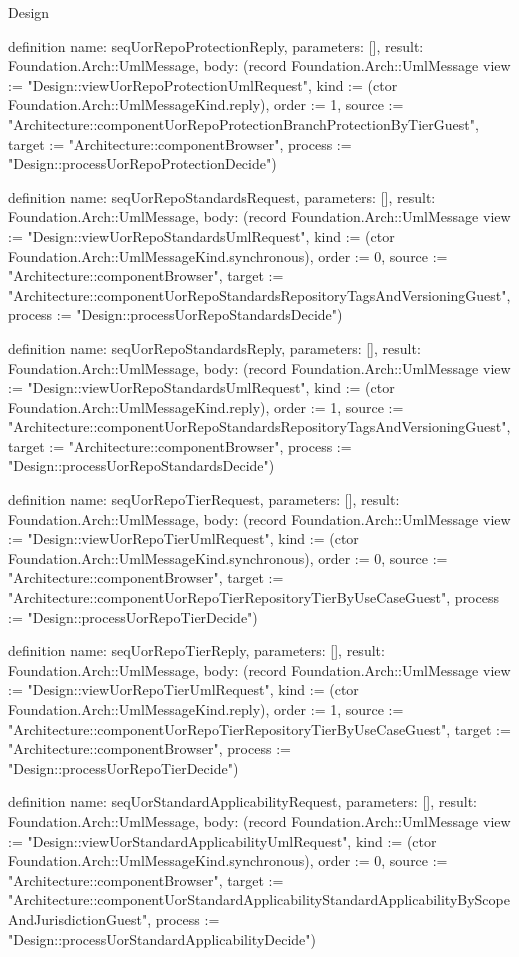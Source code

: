 \begin{lexlean}{Design}
\begin{semanticmodule}
definition{
  name: seqUorRepoProtectionReply,
  parameters: [],
  result: Foundation.Arch::UmlMessage,
  body: (record Foundation.Arch::UmlMessage {view := "Design::viewUorRepoProtectionUmlRequest", kind := (ctor Foundation.Arch::UmlMessageKind.reply), order := 1, source := "Architecture::componentUorRepoProtectionBranchProtectionByTierGuest", target := "Architecture::componentBrowser", process := "Design::processUorRepoProtectionDecide"})
}

definition{
  name: seqUorRepoStandardsRequest,
  parameters: [],
  result: Foundation.Arch::UmlMessage,
  body: (record Foundation.Arch::UmlMessage {view := "Design::viewUorRepoStandardsUmlRequest", kind := (ctor Foundation.Arch::UmlMessageKind.synchronous), order := 0, source := "Architecture::componentBrowser", target := "Architecture::componentUorRepoStandardsRepositoryTagsAndVersioningGuest", process := "Design::processUorRepoStandardsDecide"})
}

definition{
  name: seqUorRepoStandardsReply,
  parameters: [],
  result: Foundation.Arch::UmlMessage,
  body: (record Foundation.Arch::UmlMessage {view := "Design::viewUorRepoStandardsUmlRequest", kind := (ctor Foundation.Arch::UmlMessageKind.reply), order := 1, source := "Architecture::componentUorRepoStandardsRepositoryTagsAndVersioningGuest", target := "Architecture::componentBrowser", process := "Design::processUorRepoStandardsDecide"})
}

definition{
  name: seqUorRepoTierRequest,
  parameters: [],
  result: Foundation.Arch::UmlMessage,
  body: (record Foundation.Arch::UmlMessage {view := "Design::viewUorRepoTierUmlRequest", kind := (ctor Foundation.Arch::UmlMessageKind.synchronous), order := 0, source := "Architecture::componentBrowser", target := "Architecture::componentUorRepoTierRepositoryTierByUseCaseGuest", process := "Design::processUorRepoTierDecide"})
}

definition{
  name: seqUorRepoTierReply,
  parameters: [],
  result: Foundation.Arch::UmlMessage,
  body: (record Foundation.Arch::UmlMessage {view := "Design::viewUorRepoTierUmlRequest", kind := (ctor Foundation.Arch::UmlMessageKind.reply), order := 1, source := "Architecture::componentUorRepoTierRepositoryTierByUseCaseGuest", target := "Architecture::componentBrowser", process := "Design::processUorRepoTierDecide"})
}

definition{
  name: seqUorStandardApplicabilityRequest,
  parameters: [],
  result: Foundation.Arch::UmlMessage,
  body: (record Foundation.Arch::UmlMessage {view := "Design::viewUorStandardApplicabilityUmlRequest", kind := (ctor Foundation.Arch::UmlMessageKind.synchronous), order := 0, source := "Architecture::componentBrowser", target := "Architecture::componentUorStandardApplicabilityStandardApplicabilityByScopeAndJurisdictionGuest", process := "Design::processUorStandardApplicabilityDecide"})
}


\end{semanticmodule}
\end{lexlean}
